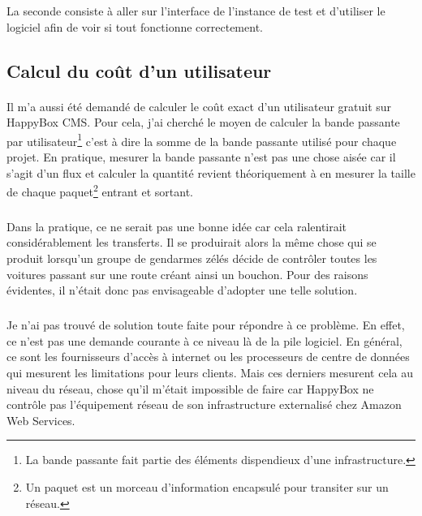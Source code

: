 \documentclass[11pt, a4paper ]{article}
\begin{document}
\begin{spacing}{1.5}
La seconde consiste à aller sur l'interface de l'instance de test et d'utiliser le logiciel afin de voir si tout fonctionne correctement.


\subsection{Calcul du coût d'un utilisateur}
\paragraph{}
Il m'a aussi été demandé de calculer le coût exact d'un utilisateur gratuit sur HappyBox CMS. Pour cela, j'ai cherché le moyen de calculer la bande passante par utilisateur\footnote{La bande passante fait partie des éléments dispendieux d'une infrastructure.} c'est à dire la somme de la bande passante utilisé pour chaque projet. En pratique, mesurer la bande passante n'est pas une chose aisée car il s'agit d'un flux et calculer la quantité revient théoriquement à en mesurer la taille de chaque paquet\footnote{Un paquet est un morceau d'information encapsulé pour transiter sur un réseau.} entrant et sortant.
\subparagraph{}
Dans la pratique, ce ne serait pas une bonne idée car cela ralentirait considérablement les transferts. Il se produirait alors la même chose qui se produit lorsqu'un groupe de gendarmes zélés décide de contrôler toutes les voitures passant sur une route créant ainsi un bouchon. Pour des raisons évidentes, il n'était donc pas envisageable d'adopter une telle solution.
\subparagraph{}
Je n'ai pas trouvé de solution toute faite pour répondre à ce problème. En effet, ce n'est pas une demande courante à ce niveau là de la pile logiciel. En général, ce sont les fournisseurs d'accès à internet ou les processeurs de centre de données qui mesurent les limitations pour leurs clients. Mais ces derniers mesurent cela au niveau du réseau, chose qu'il m'était impossible de faire car HappyBox ne contrôle pas l'équipement réseau de son infrastructure externalisé chez Amazon Web Services.


\end{spacing}
\end{document}
